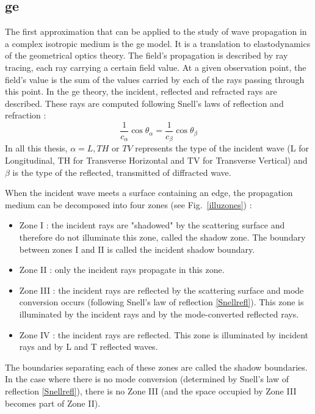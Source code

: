 \subsection{\acrfull{ge}}
\label{sectGE}
The first approximation that can be applied to the study of wave propagation in a complex isotropic medium is the \acrfull{ge} model. It is a translation to elastodynamics of the geometrical optics theory. The field's propagation is described by ray tracing, each ray carrying a certain field value. At a given observation point, the field's value is the sum of the values carried by each of the rays passing through this point. In the \acrshort{ge} theory, the incident, reflected and refracted rays are described. These rays are computed following Snell's laws of reflection and refraction :
\begin{equation}
    \frac{1}{c_{\alpha}}\cos\theta_{\alpha} = \frac{1}{c_{\beta}} \cos\theta_{\beta}
    \label{Snellrefl}
\end{equation}
In all this thesis, $\alpha=L,TH$ or $TV$ represents the type of the incident wave (L for Longitudinal, TH for Transverse Horizontal and TV for Transverse Vertical) and $\beta$ is the type of the reflected, transmitted of diffracted wave.

When the incident wave meets a surface containing an edge, the propagation medium can be decomposed into four zones (see Fig.~\ref{illuzones}) :
\begin{itemize}
	\item Zone I : the incident rays are "shadowed" by the scattering surface and therefore do not illuminate this zone, called the shadow zone. The boundary between zones I and II is called the incident shadow boundary.
    \item Zone II : only the incident rays propagate in this zone.
    \item Zone III :  the incident rays are reflected by the scattering surface and mode conversion occurs (following Snell's law of reflection \eqref{Snellrefl}). This zone is illuminated by the incident rays and by the mode-converted reflected rays.
    \item Zone IV : the incident rays are reflected. This zone is illuminated by incident rays and by L and T reflected waves.
\end{itemize}

The boundaries separating each of these zones are called the shadow boundaries. In the case where there is no mode conversion (determined by Snell's law of reflection \eqref{Snellrefl}), there is no Zone III (and the space occupied by Zone III becomes part of Zone II). 

